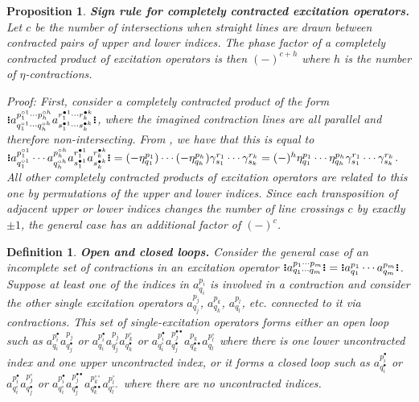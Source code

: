 \documentclass[11pt,fleqn]{article}
\newcommand{\g}{\gamma}      %
\newcommand{\h}{\eta}        %
\newcommand{\cd}{\ensuremath{\cdots}}
\newcommand{\bmit}[1]{{\bfseries\itshape\mathversion{bold}#1}}
\newcommand{\GNO}[1]{\setstackgap{S}{0.7pt}\ensuremath{\Shortstack{\textbf{.} \textbf{.} \textbf{.}}#1\Shortstack{\textbf{.} \textbf{.} \textbf{.}}}}
\theoremstyle{mystyle}
\newtheorem{dfn}{Definition}[section]
\newtheorem{pro}{Proposition}[section]
\numberwithin{equation}{section}
\newcommand{\hole}{\circ}
\newcommand{\ptcl}{\bullet}
\begin{document}
\begin{pro}
\label{excitation-operators-phase-rule}
\bmit{Sign rule for completely contracted excitation operators.}
\textit{Let $c$ be the number of intersections when straight lines are drawn between contracted pairs of upper and lower indices.
The phase factor of a completely contracted product of excitation operators is then $(-)^{c+h}$ where $h$ is the number of $\h$-contractions.}
\begin{addmargin}[1em]{0em}
Proof:
First, consider a completely contracted product of the form $\GNO{a_{q_1^{\hole1}\cd q_h^{\hole h}}^{p_1^{\hole1}\cd p_h^{\hole h}}a_{s_1^{\ptcl1}\cd s_k^{\ptcl k}}^{r_1^{\ptcl1}\cd r_k^{\ptcl k}}}$, where the imagined contraction lines are all parallel and therefore non-intersecting.
From , we have that this is equal to $\GNO{a_{q_1^{\hole1}}^{p_1^{\hole1}}\cd a_{q_h^{\hole h}}^{p_h^{\hole h}}a_{s_1^{\ptcl1}}^{r_1^{\ptcl1}}a_{s_k^{\ptcl k}}^{r_k^{\ptcl k}}}=(-\h_{q_1}^{p_1})\cd(-\h_{q_h}^{p_h})\g_{s_1}^{r_1}\cd\g_{s_k}^{r_k}=(-)^h\h_{q_1}^{p_1}\cd\h_{q_h}^{p_h}\g_{s_1}^{r_1}\cd\g_{s_k}^{r_k}$.
All other completely contracted products of excitation operators are related to this one by permutations of the upper and lower indices.
Since each transposition of adjacent upper or lower indices changes the number of line crossings $c$ by exactly $\pm1$, the general case has an additional factor of $(-)^c$.
\end{addmargin}
\end{pro}

\begin{dfn}
\bmit{Open and closed loops.}
Consider the general case of an incomplete set of contractions in an excitation operator $\GNO{a_{q_1\cd q_m}^{p_1\cd p_m}}=\GNO{a_{q_1}^{p_1}\cd a_{q_m}^{p_m}}$.
Suppose at least one of the indices in $a_{q_i}^{p_i}$ is involved in a contraction and consider the other single excitation operators $a_{q_j}^{p_j}$, $a_{q_k}^{p_k}$, $a_{q_l}^{p_l}$, etc. connected to it via contractions.
This set of single-excitation operators forms either an \textit{open loop} such as $a_{q_i}^{p_i^\ptcl}a_{q_j^\ptcl}^{p_j}$ or $a_{q_i}^{p_i^\ptcl}a_{q_j^{\hole}}^{p_j}a_{q_k^\ptcl}^{p_k^{\hole}}$ or $a_{q_i^\hole}^{p_i^\ptcl}a_{q_j^\ptcl}^{p_j^{\ptcl\ptcl}}a_{q_k^{\ptcl\ptcl}}^{p_k}a_{q_l}^{p_l^\hole}$ where there is one lower uncontracted index and one upper uncontracted index, or it forms a \textit{closed loop} such as $a_{q_i^\ptcl}^{p_i^\ptcl}$ or $a_{q_i^\hole}^{p_i^\ptcl}a_{q_j^\ptcl}^{p_j^\hole}$ or $a_{q_i^\hole}^{p_i^\ptcl}a_{q_j^\ptcl}^{p_j^{\ptcl\ptcl}}a_{q_k^{\ptcl\ptcl}}^{p_k^{\hole\hole}}a_{q_l^{\hole\hole}}^{p_l^\hole}$ where there are no uncontracted indices.
\end{dfn}
\end{document}
